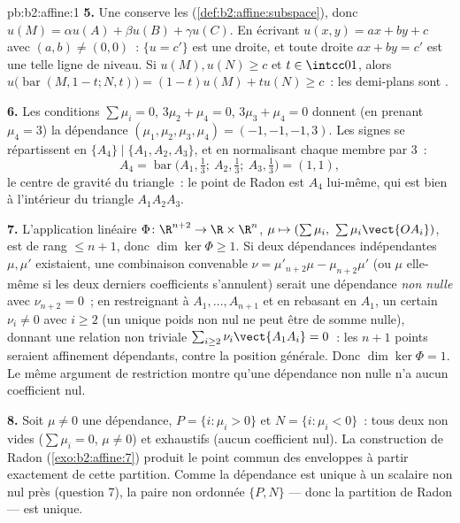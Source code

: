 \begin{solution}{pb:b2:affine:1}
\textbf{5.} Une  conserve les 
(\cref{def:b2:affine:subspace}), donc $u(M) = \alpha u(A) +
\beta u(B) + \gamma u(C)$. En écrivant $u(x, y) = ax + by + c$
avec $(a, b) \neq (0,0)$~: $\{u = c'\}$ est une droite, et toute
droite $ax + by = c'$ est une telle ligne de niveau. Si $u(M), u(N) \geq
c$ et $t \in \intcc01$, alors $u\bigl(\operatorname{bar}(M,
1-t; N, t)\bigr) = (1-t)u(M) + tu(N) \geq c$~: les demi-plans sont
.

\textbf{6.} Les conditions $\sum\mu_i = 0$, $3\mu_2 + \mu_4 =
0$, $3\mu_3 + \mu_4 = 0$ donnent (en prenant $\mu_4 = 3$) la
dépendance $(\mu_1, \mu_2, \mu_3, \mu_4) = (-1, -1, -1, 3)$.
Les signes se répartissent en $\{A_4\} \mid \{A_1, A_2, A_3\}$, et
en normalisant chaque membre par $3$~:
\[
A_4 = \operatorname{bar}\bigl(A_1, \tfrac13;\ A_2, \tfrac13;\
A_3, \tfrac13\bigr) = (1,1),
\]
le centre de gravité du triangle~: le point de Radon est $A_4$
lui-même, qui est bien à l'intérieur du triangle $A_1A_2A_3$.

\textbf{7.} L'application linéaire $\Phi \colon \R^{n+2} \to \R
\times \R^n$, $\mu \mapsto (\sum\mu_i,\
\sum\mu_i\vect{OA_i})$, est de rang $\leq n + 1$, donc $\dim\ker
\Phi \geq 1$. Si deux dépendances indépendantes $\mu, \mu'$
existaient, une combinaison convenable $\nu = \mu'_{n+2}\mu -
\mu_{n+2}\mu'$ (ou $\mu$ elle-même si les deux derniers coefficients
s'annulent) serait une dépendance \emph{non nulle} avec $\nu_{n+2}
= 0$~; en restreignant à $A_1, \dots, A_{n+1}$ et en rebasant en
$A_1$, un certain $\nu_i \neq 0$ avec $i \geq 2$ (un unique
poids non nul ne peut être de somme nulle), donnant une relation non
triviale $\sum_{i\geq2}\nu_i\vect{A_1A_i} = 0$~: les $n+1$ points
seraient affinement dépendants, contre la position générale. Donc
$\dim\ker \Phi = 1$. Le même argument de restriction montre qu'une
dépendance non nulle n'a aucun coefficient nul.

\textbf{8.} Soit $\mu \neq 0$ une dépendance, $P = \{i :
\mu_i > 0\}$ et $N = \{i : \mu_i < 0\}$~: tous deux non vides
($\sum\mu_i = 0$, $\mu \neq 0$) et exhaustifs (aucun coefficient
nul). La construction de Radon (\cref{exo:b2:affine:7})
produit le point commun des enveloppes à partir exactement de cette
partition. Comme la dépendance est unique à un scalaire non nul près
(question 7), la paire non ordonnée $\{P, N\}$ --- donc la
partition de Radon --- est unique.


\end{solution}
